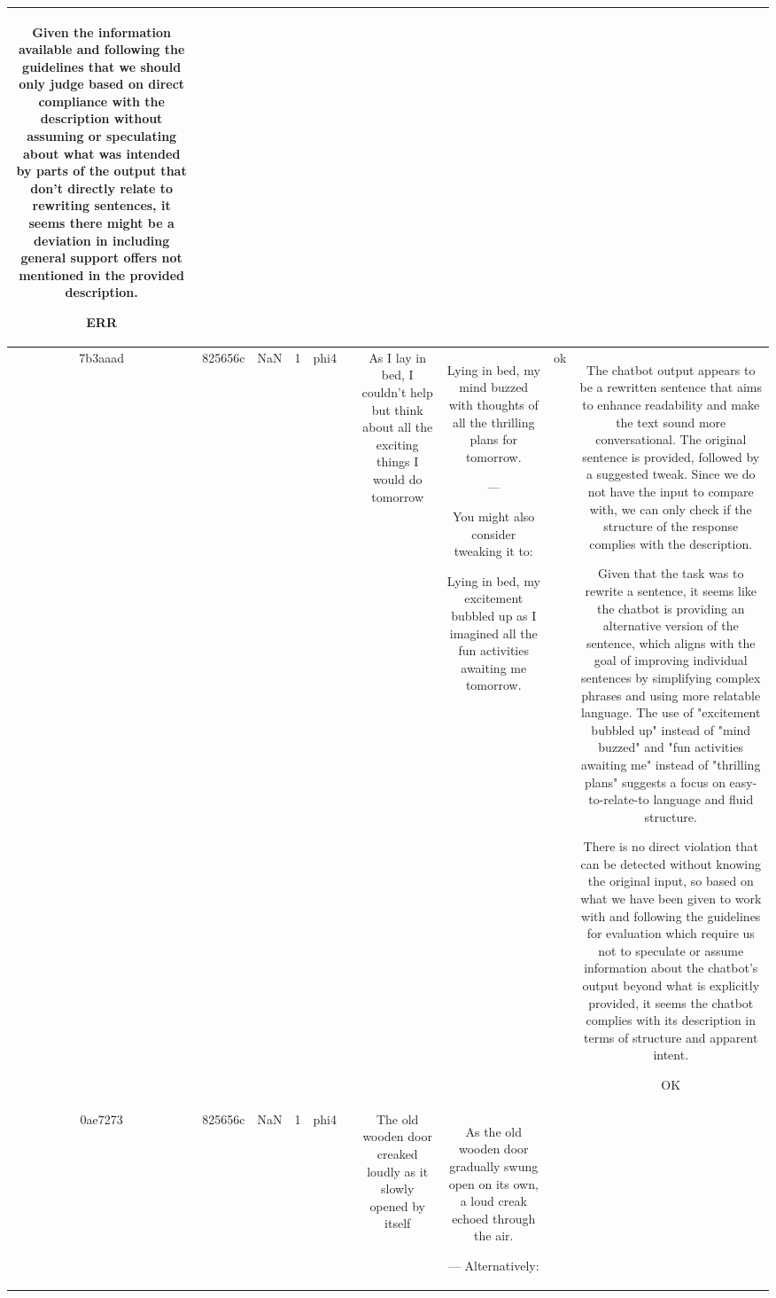 \begin{table}[h!]
\begin{tabular}{|c|c|c|c|c|c|c|c|c|c|}
Given the information available and following the guidelines that we should only judge based on direct compliance with the description without assuming or speculating about what was intended by parts of the output that don't directly relate to rewriting sentences, it seems there might be a deviation in including general support offers not mentioned in the provided description.

ERR\\
\hline
7b3aaad & 825656c & NaN & 1 & phi4 &  & As I lay in bed, I couldn't help but think about all the exciting things I would do tomorrow & Lying in bed, my mind buzzed with thoughts of all the thrilling plans for tomorrow.

— 

You might also consider tweaking it to:

Lying in bed, my excitement bubbled up as I imagined all the fun activities awaiting me tomorrow. & ok & The chatbot output appears to be a rewritten sentence that aims to enhance readability and make the text sound more conversational. The original sentence is provided, followed by a suggested tweak. Since we do not have the input to compare with, we can only check if the structure of the response complies with the description.

Given that the task was to rewrite a sentence, it seems like the chatbot is providing an alternative version of the sentence, which aligns with the goal of improving individual sentences by simplifying complex phrases and using more relatable language. The use of "excitement bubbled up" instead of "mind buzzed" and "fun activities awaiting me" instead of "thrilling plans" suggests a focus on easy-to-relate-to language and fluid structure.

There is no direct violation that can be detected without knowing the original input, so based on what we have been given to work with and following the guidelines for evaluation which require us not to speculate or assume information about the chatbot's output beyond what is explicitly provided, it seems the chatbot complies with its description in terms of structure and apparent intent.

OK\\
\hline
0ae7273 & 825656c & NaN & 1 & phi4 &  & The old wooden door creaked loudly as it slowly opened by itself & As the old wooden door gradually swung open on its own, a loud creak echoed through the air.

— Alternatively:


\end{tabular}
\end{table}
